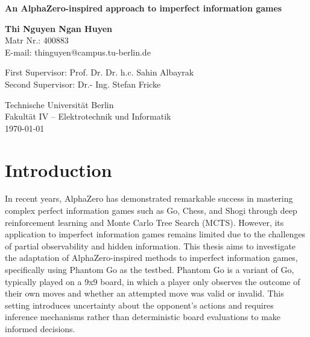 \documentclass[12pt,oneside,openright]{article}
\newcommand{\topic}
{An AlphaZero-inspired approach to imperfect information games}
\begin{document}
\date{\today}
\begin{center}
    \vspace*{1cm}
    \Huge
    \textbf{\topic}
    \LARGE

    \vspace{2cm}

    \textbf{Thi Nguyen Ngan Huyen}\\
    \vspace{0.5cm}
    \normalsize
    Matr Nr.: 400883\\
    E-mail: thinguyen@campus.tu-berlin.de
    \vspace{2cm}

    \large
    \begin{center}
        First Supervisor: Prof. Dr. Dr. h.c. Sahin Albayrak \\
        Second Supervisor: Dr.- Ing. Stefan Fricke
    \end{center}        \vspace{0.8cm}

    \Large
    Technische Universität Berlin\\
    Fakultät IV – Elektrotechnik und Informatik\\
    \vspace{1cm}
    \today
\end{center}
\newpage

\section{Introduction}
In recent years, AlphaZero has demonstrated remarkable success in mastering
complex perfect information games such as Go, Chess, and Shogi through deep
reinforcement learning and Monte Carlo Tree Search (MCTS).
However, its application to imperfect information games remains limited
due to the challenges of partial observability and hidden information.
This thesis aims to investigate the adaptation of AlphaZero-inspired methods
to imperfect information games, specifically using Phantom Go as the testbed.
Phantom Go is a variant of Go, typically played on a 9x9 board,
in which a player only observes the outcome of their own moves and whether
an attempted move was valid or invalid.
This setting introduces uncertainty about the opponent's actions and
requires inference mechanisms rather than deterministic board evaluations
to make informed decisions.
\end{document}
